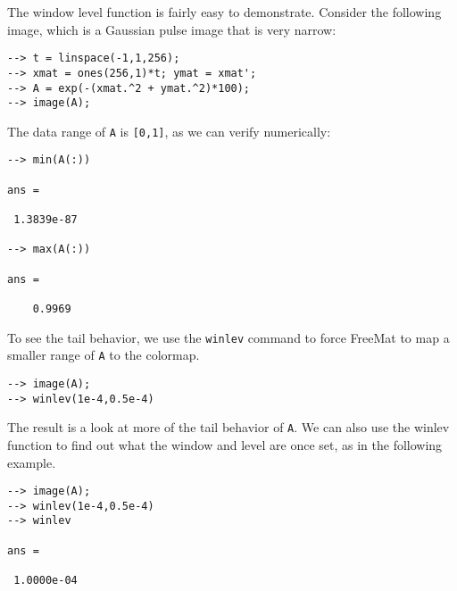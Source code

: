The window level function is fairly easy to demonstrate.  Consider
the following image, which is a Gaussian pulse image that is very 
narrow:
\begin{verbatim}
--> t = linspace(-1,1,256);
--> xmat = ones(256,1)*t; ymat = xmat';
--> A = exp(-(xmat.^2 + ymat.^2)*100);
--> image(A);
\end{verbatim}
The data range of \verb|A| is \verb|[0,1]|, as we can verify numerically:
\begin{verbatim}
--> min(A(:))

ans = 

 1.3839e-87 

--> max(A(:))

ans = 

    0.9969 
\end{verbatim}
To see the tail behavior, we use the \verb|winlev| command to force FreeMat
to map a smaller range of \verb|A| to the colormap.
\begin{verbatim}
--> image(A);
--> winlev(1e-4,0.5e-4)
\end{verbatim}
The result is a look at more of the tail behavior of \verb|A|.
We can also use the winlev function to find out what the
window and level are once set, as in the following example.
\begin{verbatim}
--> image(A);
--> winlev(1e-4,0.5e-4)
--> winlev

ans = 

 1.0000e-04 
\end{verbatim}
